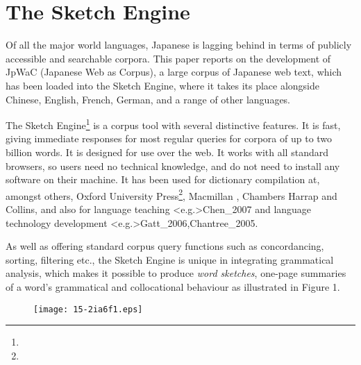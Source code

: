 \documentclass[english]{jnlp_1.4}
\newcommand{\url}[1]{}
\begin{document}
\maketitle


\section{The Sketch Engine}

Of all the major world languages, Japanese is lagging behind in terms
of publicly accessible and searchable corpora. This paper reports on
the development of JpWaC (Japanese Web as Corpus), a large corpus of
Japanese web text, which has been loaded into the Sketch Engine, where
it takes its place alongside Chinese, English, French, German, and a
range of other languages.  

The Sketch Engine\footnote{
	\url{http://www.sketchengine.co.uk}
} is a corpus tool with several distinctive
features. It is fast, giving immediate responses for most regular
queries for corpora of up to two billion words. It is designed for use
over the web. It works with all standard browsers, so users need no
technical knowledge, and do not need to install any software on their
machine. It has been used for dictionary compilation at, amongst
others, Oxford University
Press\footnote{
	\url{http://www.askoxford.com/oec}
}, Macmillan
, Chambers Harrap and Collins, and also
for language teaching \shortcite<e.g.>{Chen_2007} and language technology
development \shortcite<e.g.>{Gatt_2006,Chantree_2005}.

As well as offering standard corpus query functions such as
concordancing, sorting, filtering etc., the Sketch Engine is unique in
integrating grammatical analysis, which makes it possible to produce
\emph{word sketches}, one-page summaries of a word's grammatical and
collocational behaviour as illustrated in Figure 1.



\begin{figure}[b]
\begin{center}
\texttt{[image: 15-2ia6f1.eps]}
\label{fig1}
\end{center}
\end{figure}
\end{document}
